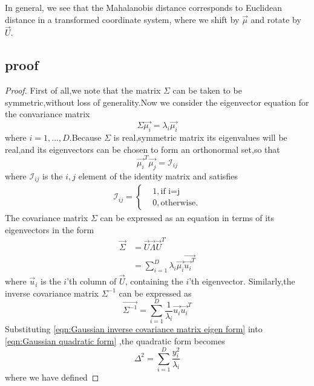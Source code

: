 In general, we see that the Mahalanobis distance corresponds to Euclidean distance in a transformed coordinate system, where we shift by $\vec{\mu}$ and rotate by $\vec{U}$.
\subsection{proof}
\begin{proof}
  First of all,we note that the matrix $\Sigma$ can be taken to be symmetric,without loss of generality.Now we consider the eigenvector equation for the convariance matrix
  \begin{equation}
  	\Sigma\vec{\mu_i} = \lambda_i\vec{\mu_i}
  \end{equation}
  where $ i = 1,...,D $.Because $\Sigma$ is real,symmetric matrix its eigenvalues will be real,and its eigenvectors can be chosen to form an orthonormal set,so that
  \begin{equation}
  \vec{\mu_i}^T\vec{\mu_j} = \mathcal{I}_{ij}
  \end{equation}
  where $\mathcal{I}_{ij}$ is the $i,j$ element of the identity matrix and satisfies 
  \begin{align}
  \mathcal{I}_{ij} = \begin{cases}
  & 1,\text{if i=j} \\
  & 0,\text{otherwise}.
  \end{cases}
  \end{align}
  The covariance matrix $\Sigma$ can be expressed as an equation in terms of its eigenvectors in the form
  \begin{eqnarray}
  	\vec{\Sigma} & =\vec{U}\vec{\Lambda}\vec{U}^T \\
  	& = \sum\limits_{i=1}^{D}\lambda_i\vec{\mu_i}\vec{\vec{u_i}^T}
  \end{eqnarray}
  where $\vec{u}_i$ is the $i$'th column of $\vec{U}$, containing the $i$'th eigenvector.
  Similarly,the inverse covariance matrix $\Sigma^{-1}$ can be expressed as 
  \begin{equation}\label{eqn:Gaussian inverse covariance matrix eigen form}
  \vec{\Sigma^{-1}} = \sum\limits_{i=1}^{D}\dfrac{1}{\lambda_i}\vec{u_i}\vec{u_i}^T
  \end{equation}
  Substituting \ref{eqn:Gaussian inverse covariance matrix eigen form} into \ref{eqn:Gaussian quadratic form} ,the quadratic form becomes
  \begin{equation}
  	\Delta^2 = \sum\limits_{i=1}^{D}\dfrac{y_i^2}{\lambda_i}
  \end{equation}
  where we have defined 

\end{proof}
